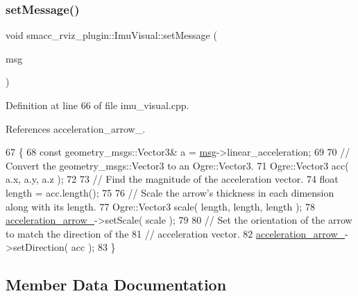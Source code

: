 \subsubsection{\texorpdfstring{set\+Message()}{setMessage()}}
{\footnotesize\ttfamily void smacc\+\_\+rviz\+\_\+plugin\+::\+Imu\+Visual\+::set\+Message (\begin{DoxyParamCaption}\item[{const sensor\+\_\+msgs\+::\+Imu\+::\+Const\+Ptr \&}]{msg }\end{DoxyParamCaption})}



Definition at line 66 of file imu\+\_\+visual.\+cpp.



References acceleration\+\_\+arrow\+\_\+.


\begin{DoxyCode}
67 \{
68   \textcolor{keyword}{const} geometry\_msgs::Vector3& a = \hyperlink{namespacebattery__monitor__node_ab1920c64448816edd4064e494275fdff}{msg}->linear\_acceleration;
69 
70   \textcolor{comment}{// Convert the geometry\_msgs::Vector3 to an Ogre::Vector3.}
71   Ogre::Vector3 acc( a.x, a.y, a.z );
72 
73   \textcolor{comment}{// Find the magnitude of the acceleration vector.}
74   \textcolor{keywordtype}{float} length = acc.length();
75 
76   \textcolor{comment}{// Scale the arrow's thickness in each dimension along with its length.}
77   Ogre::Vector3 scale( length, length, length );
78   \hyperlink{classsmacc__rviz__plugin_1_1ImuVisual_abead7d3f3c66b20bba8123a145b121b0}{acceleration\_arrow\_}->setScale( scale );
79 
80   \textcolor{comment}{// Set the orientation of the arrow to match the direction of the}
81   \textcolor{comment}{// acceleration vector.}
82   \hyperlink{classsmacc__rviz__plugin_1_1ImuVisual_abead7d3f3c66b20bba8123a145b121b0}{acceleration\_arrow\_}->setDirection( acc );
83 \}
\end{DoxyCode}


\subsection{Member Data Documentation}
\mbox{\label{classsmacc__rviz__plugin_1_1ImuVisual_abead7d3f3c66b20bba8123a145b121b0}} 
